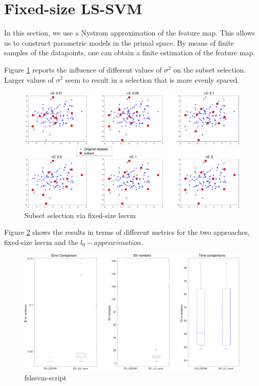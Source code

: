 \documentclass[11pt, a4paper]{article}
\begin{document}
\section{Fixed-size LS-SVM}

In this section, we use a Nystrom approximation of the feature
map. This allows us to construct parametric models in the primal
space. By means of finite samples of the datapoints, one can obtain a
finite estimation of the feature map.

Figure \ref{fig:fslssvm_sig2} reports the influence of different
values of $\sigma^2$ on the subset selection. Larger values of
$\sigma^2$ seem to result in a selection that is more evenly spaced.

\begin{figure}[H]
  \centering
  \includegraphics[scale=.40]{fslssvm_sig2.pdf}
  \caption{Subset selection via fixed-size lssvm}
  \label{fig:fslssvm_sig2}
\end{figure}

Figure \ref{fig:fslssvm_script} shows the results in terms of
different metrics for the two approaches, fixed-size lssvm and the
$l_0-approximation$.

\begin{figure}[H]
  \centering
  \includegraphics[scale=.40]{fslssvm_script.pdf}
  \caption{fslssvm-script}
  \label{fig:fslssvm_script}
\end{figure}
\end{document}

